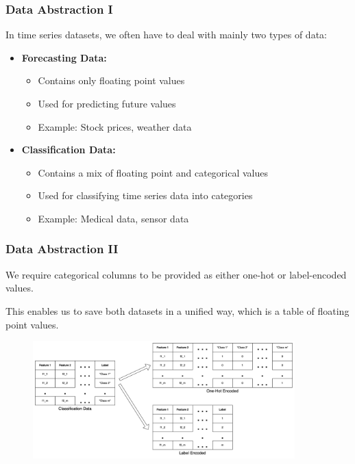 \documentclass[t,english]{beamer}
\begin{document}
\begin{frame}
  \frametitle{Data Abstraction I}
  In time series datasets, we often have to deal with mainly two types of data:
  \begin{itemize}[]
    \item \textbf{Forecasting Data:}
    \begin{itemize}
      \item Contains only floating point values
      \item Used for predicting future values
      \item Example: Stock prices, weather data
    \end{itemize}
    \item \textbf{Classification Data:}
    \begin{itemize}
      \item Contains a mix of floating point and categorical values
      \item Used for classifying time series data into categories
      \item Example: Medical data, sensor data
    \end{itemize}
  \end{itemize}
  
\end{frame}

\begin{frame}
  \frametitle{Data Abstraction II}
  We require categorical columns to be provided as either one-hot or label-encoded values.

  This enables us to save both datasets in a unified way, which is a table of floating point values.

  \begin{figure}[H]
    \includegraphics[width=0.9\textwidth]{figures/example_categorical.png}
  \end{figure}

\end{frame}
\end{document}
